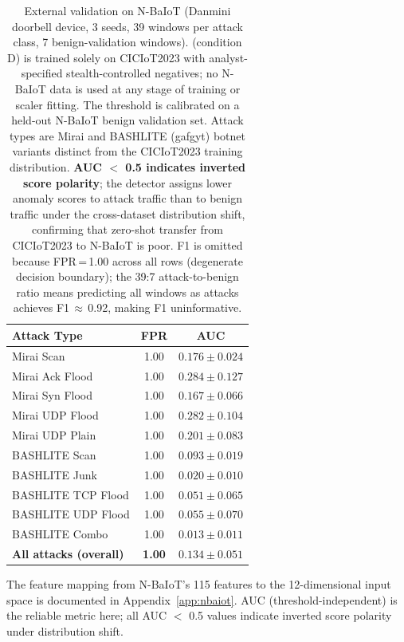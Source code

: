 
\begin{table}[h]
\centering
\caption{
  External validation on N-BaIoT (Danmini doorbell device, 3 seeds,
  39 windows per attack class, 7 benign-validation windows).
  \ours{} (condition D) is trained solely on CICIoT2023 with analyst-specified
  stealth-controlled negatives; no N-BaIoT data is used at any stage of training or
  scaler fitting.
  The threshold is calibrated on a held-out N-BaIoT benign validation set.
  Attack types are Mirai and BASHLITE (gafgyt) botnet variants distinct
  from the CICIoT2023 training distribution.
  \textbf{AUC $<$ 0.5 indicates inverted score polarity}; the detector
  assigns lower anomaly scores to attack traffic than to benign traffic
  under the cross-dataset distribution shift, confirming that
  zero-shot transfer from CICIoT2023 to N-BaIoT is poor.
  F1 is omitted because FPR\,=\,1.00 across all rows (degenerate decision
  boundary); the 39:7 attack-to-benign ratio means predicting all windows as
  attacks achieves F1\,$\approx$\,0.92, making F1 uninformative.
}
\label{tab:nbaiot}
\begin{tabular}{lcc}
\toprule
Attack Type & FPR & AUC \\
\midrule
Mirai Scan         & 1.00 & $0.176 \pm 0.024$ \\
Mirai Ack Flood    & 1.00 & $0.284 \pm 0.127$ \\
Mirai Syn Flood    & 1.00 & $0.167 \pm 0.066$ \\
Mirai UDP Flood    & 1.00 & $0.282 \pm 0.104$ \\
Mirai UDP Plain    & 1.00 & $0.201 \pm 0.083$ \\
BASHLITE Scan      & 1.00 & $0.093 \pm 0.019$ \\
BASHLITE Junk      & 1.00 & $0.020 \pm 0.010$ \\
BASHLITE TCP Flood & 1.00 & $0.051 \pm 0.065$ \\
BASHLITE UDP Flood & 1.00 & $0.055 \pm 0.070$ \\
BASHLITE Combo     & 1.00 & $0.013 \pm 0.011$ \\
\midrule
\textbf{All attacks (overall)} & \textbf{1.00} & $\mathbf{0.134 \pm 0.051}$ \\
\bottomrule
\end{tabular}
\vspace{2pt}
\begin{flushleft}
\footnotesize
The feature mapping from N-BaIoT's 115 features to the 12-dimensional \ours{}
input space is documented in Appendix~\ref{app:nbaiot}.
AUC (threshold-independent) is the reliable metric here; all AUC $<$ 0.5
values indicate inverted score polarity under distribution shift.
\end{flushleft}
\end{table}

